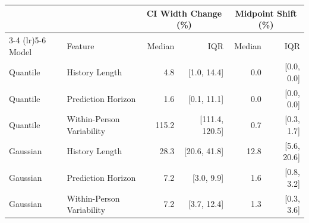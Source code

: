 \begin{table}[ht]
\centering
\footnotesize
\begin{tabular}{llrrrr}
\toprule
 & & \multicolumn{2}{c}{CI Width Change (\%)} & \multicolumn{2}{c}{Midpoint Shift (\%)} \\
\cmidrule(lr){3-4} \cmidrule(lr){5-6}
Model & Feature & Median & IQR & Median & IQR \\
\midrule
Quantile & History Length & 4.8 & [1.0, 14.4] & 0.0 & [0.0, 0.0] \\
Quantile & Prediction Horizon & 1.6 & [0.1, 11.1] & 0.0 & [0.0, 0.0] \\
Quantile & Within-Person Variability & 115.2 & [111.4, 120.5] & 0.7 & [0.3, 1.7] \\
\midrule
Gaussian & History Length & 28.3 & [20.6, 41.8] & 12.8 & [5.6, 20.6] \\
Gaussian & Prediction Horizon & 7.2 & [3.0, 9.9] & 1.6 & [0.8, 3.2] \\
Gaussian & Within-Person Variability & 7.2 & [3.7, 12.4] & 1.3 & [0.3, 3.6] \\
\bottomrule
\end{tabular}
\label{tab:sensitivity_summary}
\end{table}